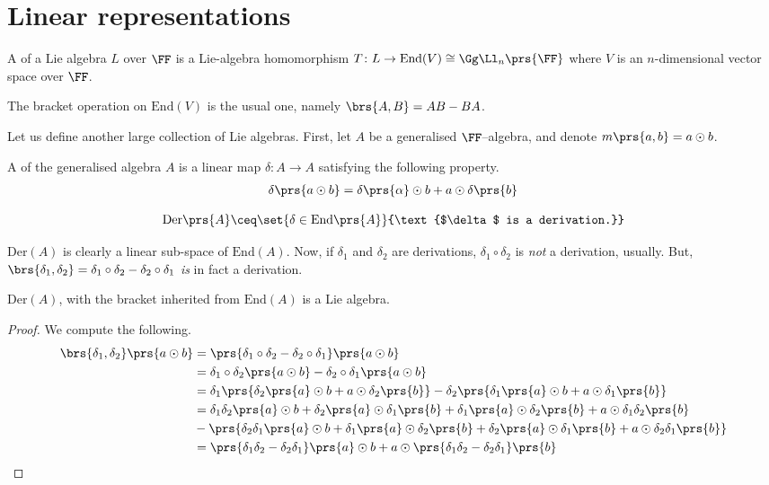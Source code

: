 \documentclass[10pt,a4paper,twoside,openany,hidelinks]{book}
\begin{document}
\section{Linear representations}
\begin{definition}
A  of a Lie algebra $L$ over $\FF$ is a Lie-algebra homomorphism $T \colon L \to \mathrm{End}(V) \cong \Gg\Ll_n\prs{\FF}$ where $V$ is an $n$-dimensional vector space over $\FF$.
\end{definition}
\begin{remark}
The bracket operation on $\mathrm{End}(V)$ is the usual one, namely $\brs{A,B} = AB - BA$.
\end{remark}
Let us define another large collection of Lie algebras. First, let $A$ be a generalised $\FF$–algebra, and denote $m\prs{a,b} = a \odot b$.\\
\begin{definition}
A  of the generalised algebra $A$ is a linear map $\delta \colon A \to A$ satisfying the following property.
\begin{align*}
\delta \prs{ a \odot b} = \delta\prs{\alpha} \odot b + a \odot \delta\prs{b}
\end{align*}
\end{definition}
\begin{definition}
\[\mathrm{Der}\prs{A} \ceq \set{\delta \in \mathrm{End}\prs{A}}{\text{$\delta$ is a derivation.}}\]
\end{definition}
\begin{remark}
$\mathrm{Der}(A)$ is clearly a linear sub-space of $\mathrm{End}(A)$.
Now, if $\delta_1$ and $\delta_2$ are derivations, $\delta_1 \circ \delta_2$ is \emph{not} a derivation, usually.
But, $\brs{\delta_1, \delta_2} = \delta_1 \circ \delta_2 - \delta_2 \circ \delta_1$ \emph{is} in fact a derivation.
\end{remark}
\begin{conclusion}
$\mathrm{Der}(A)$, with the bracket inherited from $\mathrm{End}(A)$ is a Lie algebra.
\end{conclusion}
\begin{proof}
We compute the following.
\begin{align*}
\brs{\delta_1, \delta_2}\prs{a \odot b} &= \prs{\delta_1 \circ \delta_2 - \delta_2 \circ \delta_1}\prs{a \odot b} \\
&= \delta_1 \circ \delta_2\prs{a \odot b} - \delta_2 \circ \delta_1 \prs{a \odot b} \\
&= \delta_1 \prs{\delta_2\prs{a}\odot b + a\odot \delta_2\prs{b}} - \delta_2 \prs{\delta_1\prs{a}\odot b + a\odot\delta_1\prs{b}} \\
&= \delta_1 \delta_2 \prs{a} \odot b + \delta_2\prs{a} \odot \delta_1\prs{b} + \delta_1\prs{a}\odot \delta_2\prs{b} + a\odot \delta_1\delta_2\prs{b} \\ &- \prs{\delta_2 \delta_1\prs{a} \odot b + \delta_1 \prs{a} \odot \delta_2 \prs{b} + \delta_2\prs{a} \odot \delta_1\prs{b} + a\odot \delta_2 \delta_1\prs{b}} \\
&= \prs{\delta_1 \delta_2 - \delta_2 \delta_1} \prs{a} \odot b + a\odot \prs{\delta_1 \delta_2 - \delta_2 \delta_1}\prs{b}
\end{align*}
\end{proof}
\end{document}
